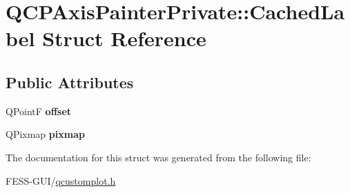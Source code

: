 \hypertarget{struct_q_c_p_axis_painter_private_1_1_cached_label}{}\section{Q\+C\+P\+Axis\+Painter\+Private\+:\+:Cached\+Label Struct Reference}
\label{struct_q_c_p_axis_painter_private_1_1_cached_label}
\subsection*{Public Attributes}
\begin{DoxyCompactItemize}
\item 
\hypertarget{struct_q_c_p_axis_painter_private_1_1_cached_label_a5f502db71c92e572f1e6f44f62c59d8e}{}\label{struct_q_c_p_axis_painter_private_1_1_cached_label_a5f502db71c92e572f1e6f44f62c59d8e} 
Q\+PointF {\bfseries offset}
\item 
\hypertarget{struct_q_c_p_axis_painter_private_1_1_cached_label_a461597cbd470914a9d24b64d16037a88}{}\label{struct_q_c_p_axis_painter_private_1_1_cached_label_a461597cbd470914a9d24b64d16037a88} 
Q\+Pixmap {\bfseries pixmap}
\end{DoxyCompactItemize}


The documentation for this struct was generated from the following file\+:\begin{DoxyCompactItemize}
\item 
F\+E\+S\+S-\/\+G\+U\+I/\hyperlink{qcustomplot_8h}{qcustomplot.\+h}\end{DoxyCompactItemize}
